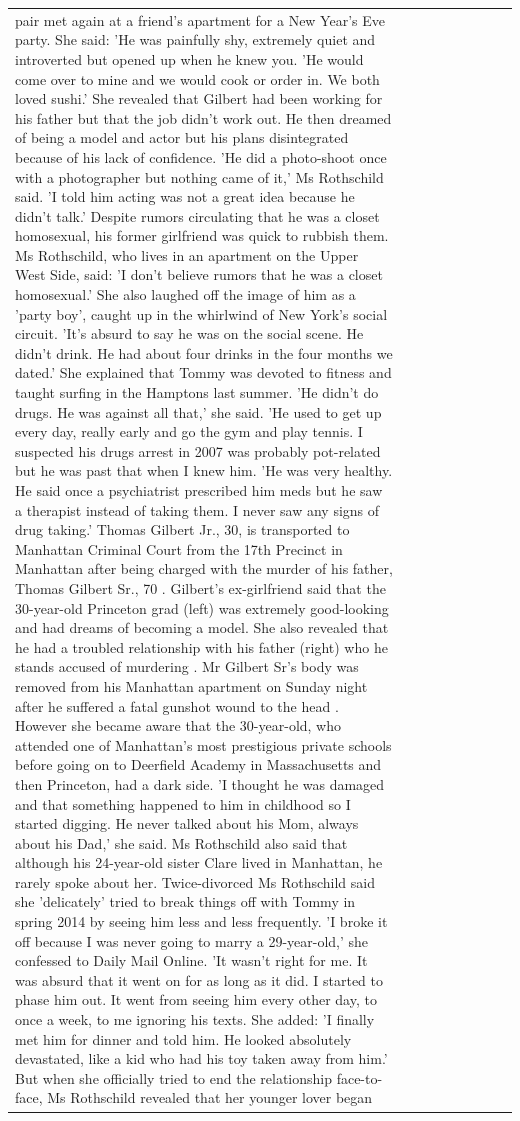 \begin{table}[H]
\begin{tabular}{lllrlllll}
pair met again at a friend’s apartment for a New Year’s Eve party. She said: 'He was painfully shy, extremely quiet and introverted but opened up when he knew you. 'He would come over to mine and we would cook or order in. We both loved sushi.' She revealed that Gilbert had been working for his father but that the job didn't work out. He then dreamed of being a model and actor but his plans disintegrated because of his lack of confidence. 'He did a photo-shoot once with a photographer but nothing came of it,' Ms Rothschild said. 'I told him acting was not a great idea because he didn’t talk.' Despite rumors circulating that he was a closet homosexual, his former girlfriend was quick to rubbish them. Ms Rothschild, who lives in an apartment on the Upper West Side, said: 'I don’t believe rumors that he was a closet homosexual.' She also laughed off the image of him as a 'party boy', caught up in the whirlwind of New York's social circuit. 'It’s absurd to say he was on the social scene. He didn’t drink. He had about four drinks in the four months we dated.' She explained that Tommy was devoted to fitness and taught surfing in the Hamptons last summer. 'He didn’t do drugs. He was against all that,' she said. 'He used to get up every day, really early and go the gym and play tennis. I suspected his drugs arrest in 2007 was probably pot-related but he was past that when I knew him. 'He was very healthy. He said once a psychiatrist prescribed him meds but he saw a therapist instead of taking them. I never saw any signs of drug taking.' Thomas Gilbert Jr., 30, is transported to Manhattan Criminal Court from the 17th Precinct in Manhattan after being charged with the murder of his father, Thomas Gilbert Sr., 70 . Gilbert's ex-girlfriend said that the 30-year-old Princeton grad (left) was extremely good-looking and had dreams of becoming a model. She also revealed that he had a troubled relationship with his father (right) who he stands accused of murdering . Mr Gilbert Sr's body was removed from his Manhattan apartment on Sunday night after he suffered a fatal gunshot wound to the head . However she became aware that the 30-year-old, who attended one of Manhattan's most prestigious private schools before going on to Deerfield Academy in Massachusetts and then Princeton, had a dark side. 'I thought he was damaged and that something happened to him in childhood so I started digging. He never talked about his Mom, always about his Dad,' she said. Ms Rothschild also said that although his 24-year-old sister Clare lived in Manhattan, he rarely spoke about her. Twice-divorced Ms Rothschild said she 'delicately' tried to break things off with Tommy in spring 2014 by seeing him less and less frequently. 'I broke it off because I was never going to marry a 29-year-old,' she confessed to Daily Mail Online. 'It wasn’t right for me. It was absurd that it went on for as long as it did. I started to phase him out. It went from seeing him every other day, to once a week, to me ignoring his texts. She added: 'I finally met him for dinner and told him. He looked absolutely devastated, like a kid who had his toy taken away from him.' But when she officially tried to end the relationship face-to-face, Ms Rothschild revealed that her younger lover began 
\end{tabular}
\end{table}
